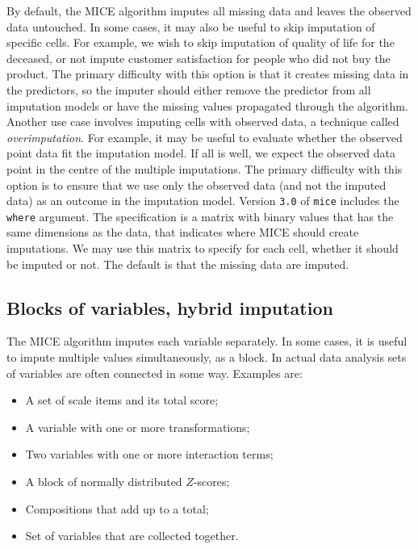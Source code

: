 \documentclass[
]{book}
\providecommand{\tightlist}{%
  \setlength{\itemsep}{0pt}\setlength{\parskip}{0pt}}
\begin{document}
By default, the MICE algorithm imputes all missing data and leaves the observed data untouched. In some cases, it may also be useful to skip imputation of specific cells. For example, we wish to skip imputation of quality of life for the deceased, or not impute customer satisfaction for people who did not buy the product. The primary difficulty with this option is that it creates missing data in the predictors, so the imputer should either remove the predictor from all imputation models or have the missing values propagated through the algorithm. Another use case involves imputing cells with observed data, a technique called \emph{overimputation}. For example, it may be useful to evaluate whether the observed point data fit the imputation model. If all is well, we expect the observed data point in the centre of the multiple imputations. The primary difficulty with this option is to ensure that we use only the observed data (and not the imputed data) as an outcome in the imputation model. Version \texttt{3.0} of \texttt{mice} includes the \texttt{where} argument. The specification is a matrix with binary values that has the same dimensions as the data, that indicates where MICE should create imputations. We may use this matrix to specify for each cell, whether it should be imputed or not. The default is that the missing data are imputed.

\hypertarget{sec:blockvar}{%
\subsection{Blocks of variables, hybrid imputation}\label{sec:blockvar}}

The MICE algorithm imputes each variable separately. In some cases, it is useful to impute multiple values simultaneously, as a block. In actual data analysis sets of variables are often connected in some way. Examples are:

\begin{itemize}
\tightlist
\item
  A set of scale items and its total score;
\item
  A variable with one or more transformations;
\item
  Two variables with one or more interaction terms;
\item
  A block of normally distributed \(Z\)-scores;
\item
  Compositions that add up to a total;
\item
  Set of variables that are collected together.
\end{itemize}
\end{document}
